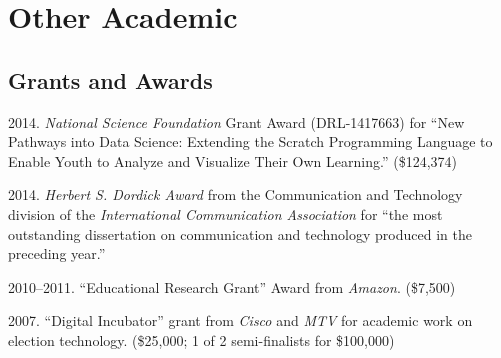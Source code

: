 \documentclass[10pt]{article}
\newenvironment{cvlist}{
\begin{list}{}{\leftmargin=3.0em \itemindent=-3.0em}
  \setlength{\itemsep}{0pt}
  \setlength{\parskip}{0em}
  \setlength{\parsep}{1em}
  \setlength{\parindent}{0em}}
{\vspace{1em}
\end{list}}
\begin{document}

\section{Other Academic}


\subsection{Grants and Awards}

\begin{cvlist}
\item 2014. \emph{National Science Foundation} Grant Award (DRL-1417663) for ``New Pathways into Data Science: Extending the Scratch Programming Language to Enable Youth to Analyze and Visualize Their Own Learning.'' (\$124,374)
\item 2014. \emph{Herbert S. Dordick Award} from the Communication and Technology division of the \emph{International Communication Association} for ``the most outstanding dissertation on communication and technology produced in the preceding year.''
\item 2010--2011. ``Educational Research Grant'' Award from \emph{Amazon}. (\$7,500)
\item 2007. ``Digital Incubator'' grant from \emph{Cisco} and \emph{MTV} for academic work on election technology. (\$25,000; 1 of 2 semi-finalists for \$100,000)
\end{cvlist}
\end{document}
